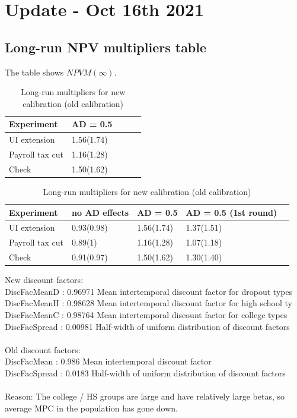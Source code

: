 \documentclass[]{article}
\begin{document}
	
\section{Update - Oct 16th 2021}

\FloatBarrier
\subsection{Long-run NPV multipliers table}

The table shows $NPVM(\infty)$.

\begin{table}[htb]
	\centering
	\begin{tabular}{@{}lllll@{}}
		\toprule
		Experiment  	& AD = 0.5 		\\ \midrule 
		UI extension    & 1.56(1.74) 					\\
		Payroll tax cut & 1.16(1.28)  		   	\\
		Check		    & 1.50(1.62) 		\\ \bottomrule
	\end{tabular}	
	\caption{Long-run multipliers for new calibration (old calibration)}
\end{table}

\begin{table}[htb]
	\centering
	\begin{tabular}{@{}lllll@{}}
		\toprule
		Experiment  	& no AD effects & AD = 0.5 		& AD = 0.5 (1st round)	\\ \midrule 
		UI extension    & 0.93(0.98) 	& 1.56(1.74) 	& 1.37(1.51) 				\\
		Payroll tax cut & 0.89(1)		& 1.16(1.28)   	& 1.07(1.18)  			   	\\
		Check		    & 0.91(0.97)	& 1.50(1.62) 	& 1.30(1.40) 				\\ \bottomrule
	\end{tabular}	
	\caption{Long-run multipliers for new calibration (old calibration)}
\end{table}

New discount factors: \\
DiscFacMeanD : 0.96971    Mean intertemporal discount factor for dropout types \\
DiscFacMeanH : 0.98628   Mean intertemporal discount factor for high school ty \\
DiscFacMeanC : 0.98764   Mean intertemporal discount factor for college types \\
DiscFacSpread : 0.00981   Half-width of uniform distribution of discount factors \\
\\
Old discount factors: \\
DiscFacMean     : 0.986      Mean intertemporal discount factor  \\
DiscFacSpread   : 0.0183     Half-width of uniform distribution of discount factors\\
\\
Reason: The college / HS groups are large and have relatively large betas, so average MPC in the population has gone down.
\end{document}
